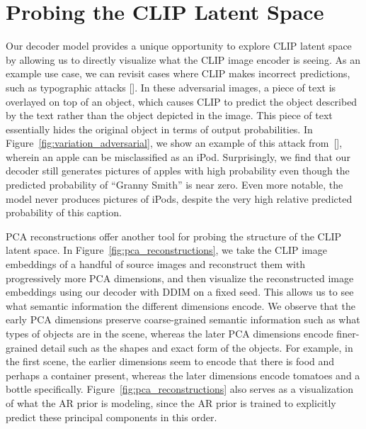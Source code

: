 \documentclass{article}
\newcommand{\shortcite}[1]{[\citenum{#1}]}
\begin{document}
\section{Probing the CLIP Latent Space}
\label{sec:latentspace}

Our decoder model provides a unique opportunity to explore CLIP latent space by allowing us to directly visualize what the CLIP image encoder is seeing. 
As an example use case, we can revisit cases where CLIP makes incorrect predictions, such as typographic attacks \shortcite{multimodalneurons}. In these adversarial images, a piece of text is overlayed on top of an object, which causes CLIP to predict the object described by the text rather than the object depicted in the image. This piece of text essentially hides the original object in terms of output probabilities. In Figure~\ref{fig:variation_adversarial}, we show an example of this attack from~\shortcite{multimodalneurons}, wherein an apple can be misclassified as an iPod. Surprisingly, we find that our decoder still generates pictures of apples with high probability even though the predicted probability of ``Granny Smith'' is near zero. Even more notable, the model never produces pictures of iPods, despite the very high relative predicted probability of this caption.

PCA reconstructions offer another tool for probing the structure of the CLIP latent space. In Figure~\ref{fig:pca_reconstructions}, we take the CLIP image embeddings of a handful of source images and reconstruct them with progressively more PCA dimensions, and then visualize the reconstructed image embeddings using our decoder with DDIM on a fixed seed. This allows us to see what semantic information the different dimensions encode. We observe that the early PCA dimensions preserve coarse-grained semantic information such as what types of objects are in the scene, whereas the later PCA dimensions encode finer-grained detail such as the shapes and exact form of the objects. For example, in the first scene, the earlier dimensions seem to encode that there is food and perhaps a container present, whereas the later dimensions encode tomatoes and a bottle specifically. Figure~\ref{fig:pca_reconstructions} also serves as a visualization of what the AR prior is modeling, since the AR prior is trained to explicitly predict these principal components in this order.
\end{document}
